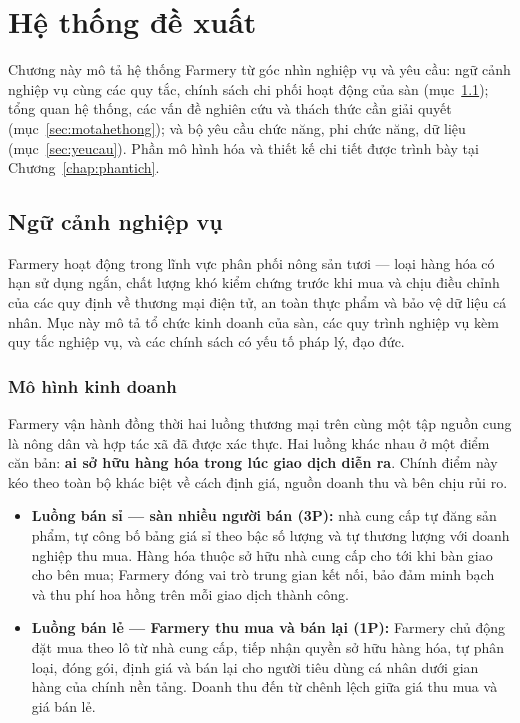 \chapter{Hệ thống đề xuất}
\label{chap:hethong}

Chương này mô tả hệ thống Farmery từ góc nhìn nghiệp vụ và yêu cầu: ngữ cảnh nghiệp vụ cùng các quy tắc, chính sách chi phối hoạt động của sàn (mục~\ref{sec:ngucanh}); tổng quan hệ thống, các vấn đề nghiên cứu và thách thức cần giải quyết (mục~\ref{sec:motahethong}); và bộ yêu cầu chức năng, phi chức năng, dữ liệu (mục~\ref{sec:yeucau}). Phần mô hình hóa và thiết kế chi tiết được trình bày tại Chương~\ref{chap:phantich}.

\section{Ngữ cảnh nghiệp vụ}
\label{sec:ngucanh}

Farmery hoạt động trong lĩnh vực phân phối nông sản tươi --- loại hàng hóa có hạn sử dụng ngắn, chất lượng khó kiểm chứng trước khi mua và chịu điều chỉnh của các quy định về thương mại điện tử, an toàn thực phẩm và bảo vệ dữ liệu cá nhân. Mục này mô tả tổ chức kinh doanh của sàn, các quy trình nghiệp vụ kèm quy tắc nghiệp vụ, và các chính sách có yếu tố pháp lý, đạo đức.

\subsection{Mô hình kinh doanh}
\label{sec:businessmodelcanvas}

Farmery vận hành đồng thời hai luồng thương mại trên cùng một tập nguồn cung là nông dân và hợp tác xã đã được xác thực. Hai luồng khác nhau ở một điểm căn bản: \textbf{ai sở hữu hàng hóa trong lúc giao dịch diễn ra}. Chính điểm này kéo theo toàn bộ khác biệt về cách định giá, nguồn doanh thu và bên chịu rủi ro.

\begin{itemize}
    \item \textbf{Luồng bán sỉ --- sàn nhiều người bán (3P):} nhà cung cấp tự đăng sản phẩm, tự công bố bảng giá sỉ theo bậc số lượng và tự thương lượng với doanh nghiệp thu mua. Hàng hóa thuộc sở hữu nhà cung cấp cho tới khi bàn giao cho bên mua; Farmery đóng vai trò trung gian kết nối, bảo đảm minh bạch và thu phí hoa hồng trên mỗi giao dịch thành công.
    \item \textbf{Luồng bán lẻ --- Farmery thu mua và bán lại (1P):} Farmery chủ động đặt mua theo lô từ nhà cung cấp, tiếp nhận quyền sở hữu hàng hóa, tự phân loại, đóng gói, định giá và bán lại cho người tiêu dùng cá nhân dưới gian hàng của chính nền tảng. Doanh thu đến từ chênh lệch giữa giá thu mua và giá bán lẻ.
\end{itemize}

